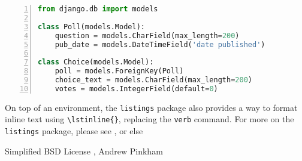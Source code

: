 \noindent\minipage{\linewidth} %
\begin{lstlisting}[aboveskip=\baselineskip,%
                   basicstyle=\ttfamily,%
                   belowskip=\baselineskip,%
                   caption={models.py from Django Tutorial},%
                   columns=fixed,%
                   firstnumber=1,%
                   frame=single,%
                   label=code:django:models_basic,%
                   language=Python,%
                   numbers=left,%
                   showstringspaces=false,%
                   showspaces=false]
from django.db import models

class Poll(models.Model):
    question = models.CharField(max_length=200)
    pub_date = models.DateTimeField('date published')

class Choice(models.Model):
    poll = models.ForeignKey(Poll)
    choice_text = models.CharField(max_length=200)
    votes = models.IntegerField(default=0)
\end{lstlisting}
\endminipage %

On top of an environment, the \lstinline{listings} package also provides a way to format inline text using \lstinline|\lstinline{}|, replacing the \lstinline{verb} command. For more on the \lstinline{listings} package, please see , or else 

\begin{center}
Simplified BSD License , Andrew Pinkham
 \end{center}


